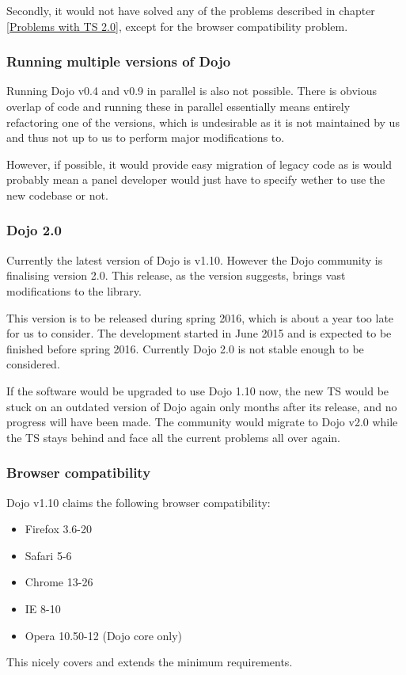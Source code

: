 Secondly, it would not have solved any of the problems described in chapter \ref{Problems with TS 2.0},
except for the browser compatibility problem.

\subsubsection{Running multiple versions of Dojo}
Running Dojo v0.4 and v0.9 in parallel is also not possible. There is obvious
overlap of code and running these in parallel essentially means entirely
refactoring one of the versions, which is undesirable as it is not maintained
by us and thus not up to us to perform major modifications to.

However, if possible, it would provide easy migration of legacy code as is would
probably mean a panel developer would just have to specify wether to use the new
codebase or not.

\subsubsection{Dojo 2.0}
Currently the latest version of Dojo is v1.10. However the Dojo community is
finalising version 2.0. This release, as the version suggests, brings vast
modifications to the library.

This version is to be released during spring 2016, which is about a year too late
for us to consider. The development started in June 2015 and is expected to be
finished before spring 2016. Currently Dojo 2.0 is not stable enough to be
considered.

If the software would be upgraded to use Dojo 1.10 now, the new TS would be stuck on an outdated
version of Dojo again only months after its release, and no progress will have
been made.
The community would migrate to Dojo v2.0 while the TS stays behind and face all the
current problems all over again.

\subsubsection{Browser compatibility}
Dojo v1.10 claims the following browser compatibility:
\begin{itemize}[noitemsep]
\item Firefox 3.6-20
\item Safari 5-6
\item Chrome 13-26
\item IE 8-10
\item Opera 10.50-12 (Dojo core only)
\end{itemize}
This nicely covers and extends the minimum requirements.

